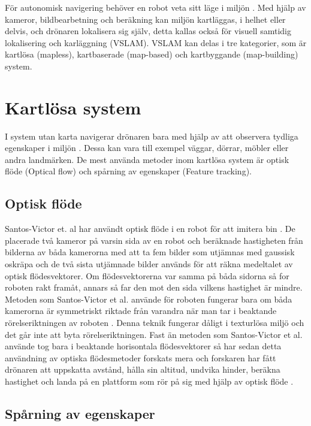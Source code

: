 För autonomisk navigering behöver en robot veta sitt läge i miljön \citep{geospatial}. Med hjälp av kameror, bildbearbetning och beräkning kan miljön kartläggas, i helhet eller delvis, och drönaren lokalisera sig själv, detta kallas också för visuell samtidig lokalisering och karläggning (VSLAM). VSLAM kan delas i tre kategorier, som är kartlösa (mapless), kartbaserade (map-based) och kartbyggande (map-building) system. 

\section{Kartlösa system}

I system utan karta navigerar drönaren bara med hjälp av att observera tydliga egenskaper i miljön \citep{982903}. Dessa kan vara till exempel väggar, dörrar, möbler eller andra landmärken. De mest använda metoder inom kartlösa system är optisk flöde (Optical flow) och spårning av egenskaper (Feature tracking). 

\subsection{Optisk flöde}

Santos-Victor et. al har användt optisk flöde i en robot för att imitera bin \citep{341094}. De placerade två kameror på varsin sida av en robot och beräknade hastigheten från bilderna av båda kamerorna med att ta fem bilder som utjämnas med gaussisk oskräpa och de två sista utjämnade bilder används för att räkna medeltalet av optisk flödesvektorer. Om flödesvektorerna var samma på båda sidorna så for roboten rakt framåt, annars så far den mot den sida vilkens hastighet är mindre. Metoden som Santos-Victor et al. använde för roboten fungerar bara om båda kamerorna är symmetriskt riktade från varandra när man tar i beaktande rörelseriktningen av roboten \citep{982903}. Denna teknik fungerar dåligt i texturlösa miljö och det går inte att byta rörelseriktningen. Fast än metoden som Santos-Victor et al. använde tog bara i beaktande horisontala flödesvektorer så har sedan detta användning av optiska flödesmetoder forskats mera och forskaren har fått drönaren att uppskatta avstånd, hålla sin altitud, undvika hinder, beräkna hastighet och landa på en plattform som rör på sig med hjälp av optisk flöde \citep{6564752}.

\subsection{Spårning av egenskaper}

